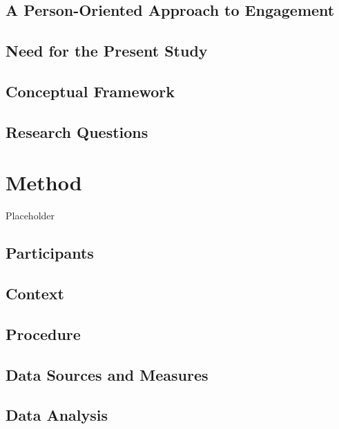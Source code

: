 \documentclass[]{book}
\begin{document}
\section{A Person-Oriented Approach to
Engagement}\label{a-person-oriented-approach-to-engagement}

\section{Need for the Present Study}\label{need-for-the-present-study}

\section{Conceptual Framework}\label{conceptual-framework}

\section{Research Questions}\label{research-questions}

\chapter{Method}\label{method}

Placeholder

\section{Participants}\label{participants}

\section{Context}\label{context}

\section{Procedure}\label{procedure}

\section{Data Sources and Measures}\label{data-sources-and-measures}

\section{Data Analysis}\label{data-analysis}
\end{document}
